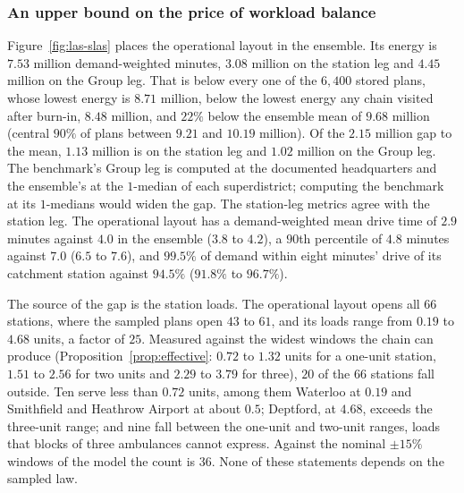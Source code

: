 \documentclass[preprint,12pt,authoryear]{elsarticle}
\theoremstyle{definition}
\begin{document}
\subsubsection{An upper bound on the price of workload balance}\label{sec:las-price}
Figure~\ref{fig:las-slas} places the operational layout in the ensemble. Its energy is $7.53$ million demand-weighted minutes, $3.08$ million on the station leg and $4.45$ million on the Group leg. That is below every one of the $6{,}400$ stored plans, whose lowest energy is $8.71$ million, below the lowest energy any chain visited after burn-in, $8.48$ million, and $22\%$ below the ensemble mean of $9.68$ million (central $90\%$ of plans between $9.21$ and $10.19$ million). Of the $2.15$ million gap to the mean, $1.13$ million is on the station leg and $1.02$ million on the Group leg. The benchmark's Group leg is computed at the documented headquarters and the ensemble's at the $1$-median of each superdistrict; computing the benchmark at its $1$-medians would widen the gap. The station-leg metrics agree with the station leg. The operational layout has a demand-weighted mean drive time of $2.9$ minutes against $4.0$ in the ensemble ($3.8$ to $4.2$), a $90$th percentile of $4.8$ minutes against $7.0$ ($6.5$ to $7.6$), and $99.5\%$ of demand within eight minutes' drive of its catchment station against $94.5\%$ ($91.8\%$ to $96.7\%$).

The source of the gap is the station loads. The operational layout opens all $66$ stations, where the sampled plans open $43$ to $61$, and its loads range from $0.19$ to $4.68$ units, a factor of $25$. Measured against the widest windows the chain can produce (Proposition~\ref{prop:effective}: $0.72$ to $1.32$ units for a one-unit station, $1.51$ to $2.56$ for two units and $2.29$ to $3.79$ for three), $20$ of the $66$ stations fall outside. Ten serve less than $0.72$ units, among them Waterloo at $0.19$ and Smithfield and Heathrow Airport at about $0.5$; Deptford, at $4.68$, exceeds the three-unit range; and nine fall between the one-unit and two-unit ranges, loads that blocks of three ambulances cannot express. Against the nominal $\pm15\%$ windows of the model the count is $36$. None of these statements depends on the sampled law.
\end{document}
